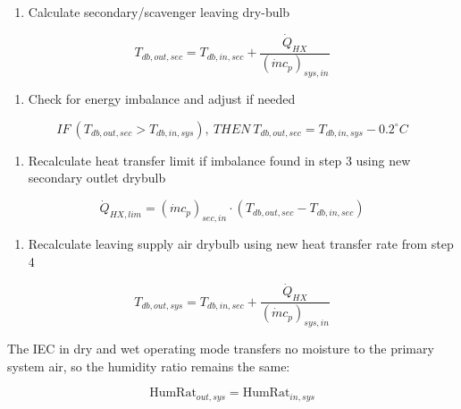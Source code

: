 \begin{enumerate}
\def\labelenumi{\arabic{enumi}.}
\setcounter{enumi}{1}
\tightlist
\item
  Calculate secondary/scavenger leaving dry-bulb
\end{enumerate}

\begin{equation}
T_{db,out,sec} = T_{db,in,sec} + \frac{\dot{Q}_{HX}}{ \left(\dot{m}c_{p}\right)_{sys,in}}
\end{equation}

\begin{enumerate}
\def\labelenumi{\arabic{enumi}.}
\setcounter{enumi}{2}
\tightlist
\item
  Check for energy imbalance and adjust if needed
\end{enumerate}

\begin{equation}
IF~\left(T_{db,out,sec}>T_{db,in,sys}\right),~THEN~T_{db,out,sec} = T_{db,in,sys}-0.2^{\circ}C
\end{equation}

\begin{enumerate}
\def\labelenumi{\arabic{enumi}.}
\setcounter{enumi}{3}
\tightlist
\item
  Recalculate heat transfer limit if imbalance found in step 3 using new secondary outlet drybulb
\end{enumerate}

\begin{equation}
\dot{Q}_{HX,lim} = \left(\dot{m}c_{p}\right)_{sec,in}\cdot \left( T_{db,out,sec}-T_{db,in,sec} \right)
\end{equation}

\begin{enumerate}
\def\labelenumi{\arabic{enumi}.}
\setcounter{enumi}{4}
\tightlist
\item
  Recalculate leaving supply air drybulb using new heat transfer rate from step 4
\end{enumerate}

\begin{equation}
T_{db,out,sys} = T_{db,in,sec} + \frac{\dot{Q}_{HX}}{ \left(\dot{m}c_{p}\right)_{sys,in}}
\end{equation}

The IEC in dry and wet operating mode transfers no moisture to the primary system air, so the humidity ratio remains the same:

\begin{equation}
\text{HumRat}_{out,sys} = \text{HumRat}_{in,sys}
\end{equation}

